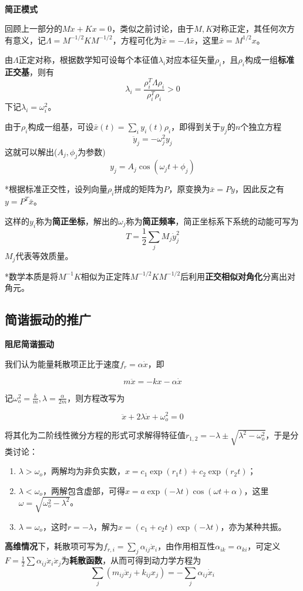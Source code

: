 \documentclass[a4paper,UTF8,fontset=windows]{ctexart}
\begin{document}
\

\textbf{简正模式}

回顾上一部分的$M\ddot{x}+Kx=0$，类似之前讨论，由于$M,K$对称正定，其任何次方有意义，记$\Lambda=M^{-1/2}KM^{-1/2}$，方程可化为$\ddot{\bar{x}}=-\Lambda\bar{x}$，这里$\bar{x}=M^{1/2}x$。

由$\Lambda$正定对称，根据数学知可设每个本征值$\lambda_i$对应本征矢量$\rho_i$，且$\rho_i$构成一组\textbf{标准正交基}，则有
$$\lambda_i=\frac{\rho_i^T\Lambda\rho_i}{\rho_i^T\rho_i}>0$$
下记$\lambda_i=\omega_i^2$。

由于$\rho_i$构成一组基，可设$\bar{x}(t)=\sum_iy_i(t)\rho_i$，即得到关于$y_j$的$n$个独立方程
$$\ddot{y}_j=-\omega_j^2y_j$$
这就可以解出($A_j,\phi_j$为参数)
$$y_j=A_j\cos(\omega_jt+\phi_j)$$

*根据标准正交性，设列向量$\rho_i$拼成的矩阵为$P$，原变换为$\bar{x}=Py$，因此反之有$y=P^T\bar{x}$。

这样的$y_i$称为\textbf{简正坐标}，解出的$\omega_j$称为\textbf{简正频率}，简正坐标系下系统的动能可写为
$$T=\frac{1}{2}\sum_jM_j\dot{y}_j^2$$
$M_j$代表等效质量。

*数学本质是将$M^{-1}K$相似为正定阵$M^{-1/2}KM^{-1/2}$后利用\textbf{正交相似对角化}分离出对角元。

\subsection{简谐振动的推广}
\textbf{阻尼简谐振动}

我们认为能量耗散项正比于速度$f_r=\alpha\dot{x}$，即

$$m\ddot{x}=-kx-\alpha\dot{x}$$

记$\omega_o^2=\frac{k}{m},\lambda=\frac{\alpha}{2m}$，则方程改写为

$$\ddot{x}+2\lambda\dot{x}+\omega_o^2=0$$

将其化为二阶线性微分方程的形式可求解得特征值$r_{1,2}=-\lambda\pm\sqrt{\lambda^2-\omega_o^2}$，于是分类讨论：
\begin{enumerate}
    \item $\lambda>\omega_o$，两解均为非负实数，$x=c_1\exp(r_1t)+c_2\exp(r_2t)$；
    \item $\lambda<\omega_o$，两解包含虚部，可得$x=a\exp(-\lambda t)\cos(\omega t+\alpha)$，这里$\omega=\sqrt{\omega_o^2-\lambda^2}$。
    \item $\lambda=\omega_o$，这时$r=-\lambda$，解为$x=(c_1+c_2t)\exp(-\lambda t)$，亦为某种共振。
\end{enumerate}

\textbf{高维情况}下，耗散项可写为$f_{r,i}=\sum_j\alpha_{ij}\dot{x}_i$，由作用相互性$\alpha_{ik}=\alpha_{ki}$，可定义$F=\frac{1}{2}\sum\alpha_{ij}\dot{x}_i\dot{x}_j$为\textbf{耗散函数}，从而可得到动力学方程为
$$\sum_j(m_{ij}\ddot{x}_j+k_{ij}x_j)=-\sum_j\alpha_{ij}\dot{x}_i$$
\end{document}
